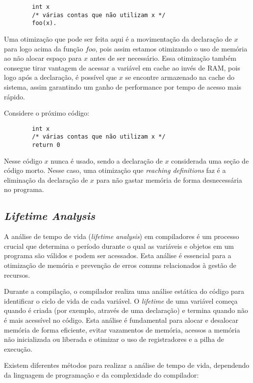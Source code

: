 \documentclass{article}
\begin{document}
    \begin{verbatim}
        int x
        /* várias contas que não utilizam x */
        foo(x).
    \end{verbatim}

    Uma otimização que pode ser feita aqui é a movimentação da declaração de $x$ para logo acima da função $foo$, pois assim estamos
    otimizando o uso de memória ao não alocar espaço para $x$ antes de ser necessário. Essa otimização também consegue tirar vantagem
    de acessar a variável em cache ao invés de RAM, pois logo após a declaração, é possível que $x$ se encontre armazenado na
    cache do sistema, assim garantindo um ganho de performance por tempo de acesso mais rápido.

    Considere o próximo código:

    \begin{verbatim}
        int x
        /* várias contas que não utilizam x */
        return 0
    \end{verbatim}

    Nesse código $x$ nunca é usado, sendo a declaração de $x$ considerada uma seção de código morto.
    Nesse caso, uma otimização que \emph{reaching definitions} faz é a eliminação da declaração de $x$ para não gastar memória
    de forma desnecessária no programa.

    \subsection*{\emph{Lifetime Analysis}}

    A análise de tempo de vida (\textit{lifetime analysis}) em compiladores é um processo crucial que determina o
    período durante o qual as variáveis e objetos em um programa são válidos e podem ser acessados. Esta análise é
    essencial para a otimização de memória e prevenção de erros comuns relacionados à gestão de recursos.

    Durante a compilação, o compilador realiza uma análise estática do código para identificar o ciclo de vida
    de cada variável. O \textit{lifetime} de uma variável começa quando é criada (por exemplo, através de uma declaração)
    e termina quando não é mais acessível no código. Esta análise é fundamental para
    alocar e desalocar memória de forma eficiente, evitar vazamentos de memória, acessos a memória não
    inicializada ou liberada e otimizar o uso de registradores e a pilha de execução.

    Existem diferentes métodos para realizar a análise de tempo de vida, dependendo da linguagem de programação e da complexidade do compilador:
\end{document}
